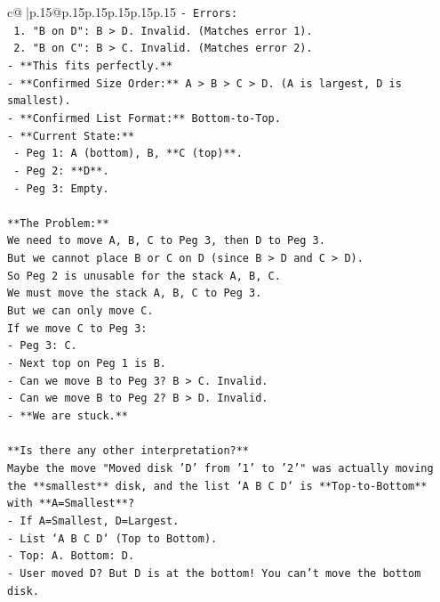 \documentclass{article}
\begin{document}
{\begin{supertabular}{c@{$\;$}|p{.15\linewidth}@{}p{.15\linewidth}p{.15\linewidth}p{.15\linewidth}p{.15\linewidth}p{.15\linewidth}}
{{{\texttt{{-} Errors:} \\
\texttt{  1. "B on D": B > D. Invalid. (Matches error 1).} \\
\texttt{  2. "B on C": B > C. Invalid. (Matches error 2).} \\
\texttt{{-} **This fits perfectly.**} \\
\texttt{{-} **Confirmed Size Order:** A > B > C > D. (A is largest, D is smallest).} \\
\texttt{{-} **Confirmed List Format:** Bottom{-}to{-}Top.} \\
\texttt{{-} **Current State:**} \\
\texttt{  {-} Peg 1: A (bottom), B, **C (top)**.} \\
\texttt{  {-} Peg 2: **D**.} \\
\texttt{  {-} Peg 3: Empty.} \\
\\ 
\texttt{**The Problem:**} \\
\texttt{We need to move A, B, C to Peg 3, then D to Peg 3.} \\
\texttt{But we cannot place B or C on D (since B > D and C > D).} \\
\texttt{So Peg 2 is unusable for the stack A, B, C.} \\
\texttt{We must move the stack A, B, C to Peg 3.} \\
\texttt{But we can only move C.} \\
\texttt{If we move C to Peg 3:} \\
\texttt{{-} Peg 3: C.} \\
\texttt{{-} Next top on Peg 1 is B.} \\
\texttt{{-} Can we move B to Peg 3? B > C. Invalid.} \\
\texttt{{-} Can we move B to Peg 2? B > D. Invalid.} \\
\texttt{{-} **We are stuck.**} \\
\\ 
\texttt{**Is there any other interpretation?**} \\
\texttt{Maybe the move "Moved disk 'D' from '1' to '2'" was actually moving the **smallest** disk, and the list `A B C D` is **Top{-}to{-}Bottom** with **A=Smallest**?} \\
\texttt{{-} If A=Smallest, D=Largest.} \\
\texttt{{-} List `A B C D` (Top to Bottom).} \\
\texttt{{-} Top: A. Bottom: D.} \\
\texttt{{-} User moved D? But D is at the bottom! You can't move the bottom disk.} \\
}}}
\end{supertabular}}
\end{document}
